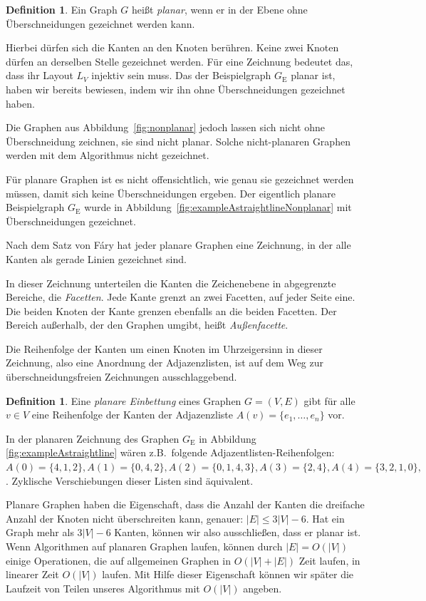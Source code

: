 \documentclass[a4paper]{scrreprt}
\theoremstyle{definition}
\newtheorem{definition}[satz]{Definition}
\begin{document}
\begin{definition}
  Ein Graph $G$ heißt \emph{planar}, wenn er in der Ebene ohne Überschneidungen gezeichnet werden kann.
\end{definition}

Hierbei dürfen sich die Kanten an den Knoten berühren. Keine zwei Knoten dürfen an derselben Stelle gezeichnet werden. Für eine Zeichnung bedeutet das, dass ihr Layout $L_V$ injektiv sein muss. Das der Beispielgraph $G_\text{E}$ planar ist, haben wir bereits bewiesen, indem wir ihn ohne Überschneidungen gezeichnet haben. 

Die Graphen aus Abbildung~\ref{fig:nonplanar} jedoch lassen sich nicht ohne Überschneidung zeichnen, sie sind nicht planar. Solche nicht-planaren Graphen werden mit dem Algorithmus nicht gezeichnet. 

Für planare Graphen ist es nicht offensichtlich, wie genau sie gezeichnet werden müssen, damit sich keine Überschneidungen ergeben. Der eigentlich planare Beispielgraph $G_\text{E}$ wurde in Abbildung~\ref{fig:exampleAstraightlineNonplanar} mit Überschneidungen gezeichnet.

Nach dem Satz von Fáry hat jeder planare Graphen eine Zeichnung, in der alle Kanten als gerade Linien gezeichnet sind. %

In dieser Zeichnung unterteilen die Kanten die Zeichenebene in abgegrenzte Bereiche, die \emph{Facetten}. Jede Kante grenzt an zwei Facetten, auf jeder Seite eine. Die beiden Knoten der Kante grenzen ebenfalls an die beiden Facetten. Der Bereich außerhalb, der den Graphen umgibt, heißt \emph{Außenfacette}.

Die Reihenfolge der Kanten um einen Knoten im Uhrzeigersinn in dieser Zeichnung, also eine Anordnung der Adjazenzlisten, ist auf dem Weg zur überschneidungsfreien Zeichnungen ausschlaggebend.


\begin{definition}
  Eine \emph{planare Einbettung} eines Graphen $G = (V, E)$ gibt für alle $v \in V$ eine Reihenfolge der Kanten der Adjazenzliste $A(v) = \{e_1, \dots, e_n\}$ vor.
\end{definition}

In der planaren Zeichnung des Graphen $G_\text{E}$ in Abbildung~ \ref{fig:exampleAstraightline} wären z.B.\ folgende Adjazentlisten-Reihenfolgen: $A(0) = \{4,1,2\}, A(1) = \{0,4,2\}, A(2) = \{0,1,4,3\}, A(3) = \{2,4\}, A(4) = \{3,2,1,0\}, $. Zyklische Verschiebungen dieser Listen sind äquivalent.

Planare Graphen haben die Eigenschaft, dass die Anzahl der Kanten die dreifache Anzahl der Knoten nicht überschreiten kann, genauer: $|E| \leq 3 |V| - 6$. Hat ein Graph mehr als $3 |V| - 6$ Kanten, können wir also ausschließen, dass er planar ist. Wenn Algorithmen auf planaren Graphen laufen, können durch $|E| = O(|V|)$ einige Operationen, die auf allgemeinen Graphen in $O(|V| + |E|)$ Zeit laufen, in linearer Zeit $O(|V|)$ laufen. Mit Hilfe dieser Eigenschaft können wir später die Laufzeit von Teilen unseres Algorithmus mit $O(|V|)$ angeben.
\end{document}
